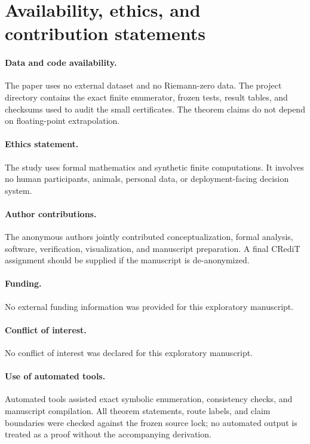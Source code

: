 \section{Availability, ethics, and contribution statements}
\label{app:statements}

\paragraph{Data and code availability.}
The paper uses no external dataset and no Riemann-zero data.  The project
directory contains the exact finite enumerator, frozen tests, result tables,
and checksums used to audit the small certificates.  The theorem claims do
not depend on floating-point extrapolation.

\paragraph{Ethics statement.}
The study uses formal mathematics and synthetic finite computations.  It
involves no human participants, animals, personal data, or deployment-facing
decision system.

\paragraph{Author contributions.}
The anonymous authors jointly contributed conceptualization, formal analysis,
software, verification, visualization, and manuscript preparation.  A final
CRediT assignment should be supplied if the manuscript is de-anonymized.

\paragraph{Funding.}
No external funding information was provided for this exploratory manuscript.

\paragraph{Conflict of interest.}
No conflict of interest was declared for this exploratory manuscript.

\paragraph{Use of automated tools.}
Automated tools assisted exact symbolic enumeration, consistency checks, and
manuscript compilation.  All theorem statements, route labels, and claim
boundaries were checked against the frozen source lock; no automated output
is treated as a proof without the accompanying derivation.

